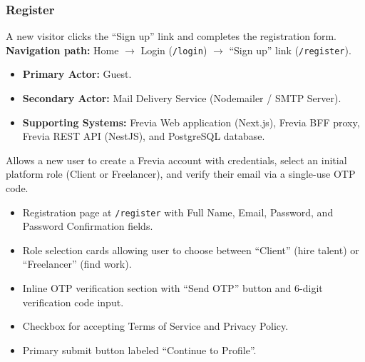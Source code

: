 \subsubsection{ Register}

A new visitor clicks the ``Sign up'' link and completes the registration form.\newline
\textbf{Navigation path:} Home $\rightarrow$ Login (\texttt{/login}) $\rightarrow$ ``Sign up'' link (\texttt{/register}).


\begin{itemize}[leftmargin=1.6em,topsep=3pt,itemsep=2pt,parsep=0pt,label=$\bullet$]
    \item \textbf{Primary Actor:} Guest.
    \item \textbf{Secondary Actor:} Mail Delivery Service (Nodemailer / SMTP Server).
    \item \textbf{Supporting Systems:} Frevia Web application (Next.js), Frevia BFF proxy, Frevia REST API (NestJS), and PostgreSQL database.
\end{itemize}

\noindent Allows a new user to create a Frevia account with credentials, select an initial platform role (Client or Freelancer), and verify their email via a single-use OTP code.

\begin{itemize}[leftmargin=1.6em,topsep=3pt,itemsep=2pt,parsep=0pt,label=$\bullet$]
    \item Registration page at \texttt{/register} with Full Name, Email, Password, and Password Confirmation fields.
    \item Role selection cards allowing user to choose between ``Client'' (hire talent) or ``Freelancer'' (find work).
    \item Inline OTP verification section with ``Send OTP'' button and 6-digit verification code input.
    \item Checkbox for accepting Terms of Service and Privacy Policy.
    \item Primary submit button labeled ``Continue to Profile''.
\end{itemize}

